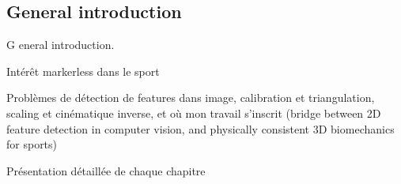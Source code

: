 {}

\vspace*{-1cm}
\begin{flushright}
\section*{\fontsize{20pt}{20pt}\selectfont\textnormal{General introduction}}
\end{flushright}
\vspace{2cm}

\chead[\fancyplain{}{}]
      {\fancyplain{}{}}
\lfoot[\fancyplain{}{}]%
      {\fancyplain{}{}}
\cfoot[\fancyplain{}{\thepage}]
      {\fancyplain{}{\thepage}}
\rfoot[\fancyplain{}{}]%
     {\fancyplain{}{\scriptsize}}
     


\lettrine[lines=1]{G}{ }eneral introduction.


Intérêt markerless dans le sport

Problèmes de détection de features dans image, calibration et triangulation, scaling et cinématique inverse, et où mon travail s'inscrit (bridge between 2D feature detection in computer vision, and physically consistent 3D biomechanics for sports)

Présentation détaillée de chaque chapitre




